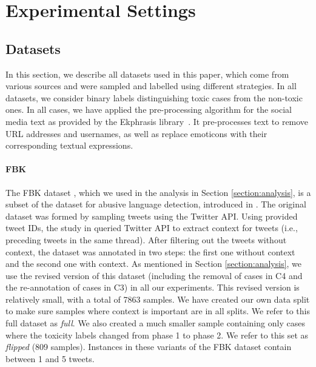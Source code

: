 \documentclass[acmsmall]{acmart}
\begin{document}
\section{Experimental Settings} \label{section:experimental_settings}

\subsection{Datasets}

In this section, we describe all datasets used in this paper, which come from various sources and were sampled and labelled using different strategies. In all datasets, we consider binary labels distinguishing toxic cases from the non-toxic ones. In all cases, we have applied the pre-processing algorithm for the social media text as provided by the Ekphrasis library~\cite{baziotis-pelekis-doulkeridis:2017:SemEval2}. It pre-processes text to remove URL addresses and usernames, as well as replace emoticons with their corresponding textual expressions. 

\paragraph{\bf FBK} The FBK dataset \cite{FBK}, which we used in the analysis in Section \ref{section:analysis}, is a subset of the dataset for abusive language detection, introduced in \cite{Antigoni}. The original dataset was formed by sampling tweets using the Twitter API. Using provided tweet IDs, the study in \cite{FBK} queried Twitter API to extract context for tweets (i.e., preceding tweets in the same thread). After filtering out the tweets without context, the dataset was annotated in two steps: the first one without context and the second one with context. As mentioned in Section \ref{section:analysis}, we use the revised version of this dataset (including the removal of cases in C4 and the re-annotation of cases in C3) in all our experiments. This revised version is relatively small, with a total of 7863 samples. We have created our own data split to make sure samples where context is important are in all  splits. We refer to this full dataset as {\em full}. We also created a much smaller sample containing only cases where the toxicity labels changed from phase 1 to phase 2. We refer to this set as {\em flipped} (809 samples).  Instances in these variants of the FBK dataset contain between 1 and 5 tweets.
\end{document}
